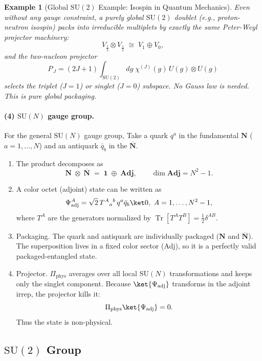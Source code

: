 \documentclass[12pt,a4paper]{article}
\newtheorem{example}{Example}
\begin{document}
\begin{example}[Global $\mathrm{SU}(2)$ Example: Isospin in Quantum Mechanics]
	Even without any gauge constraint, a purely global $\mathrm{SU}(2)$ doublet (e.g., proton-neutron isospin) packs into irreducible multiplets by exactly the same Peter-Weyl projector machinery:
	\[
	V_{\tfrac12}\otimes V_{\tfrac12}
	\;\cong\;
	V_1\oplus V_0,
	\]
	and the two-nucleon projector
	\[
	P_{\,J}
	= (2J+1)\int_{\mathrm{SU}(2)}dg\;\chi^{(J)}(g)\,U(g)\otimes U(g)
	\]
	selects the triplet ($J=1$) or singlet ($J=0$) subspace.
	No Gauss law is needed.
	This is pure global packaging.
\end{example}


\paragraph{(4) $\mathrm{SU}(N)$ gauge group.}
	
For the general $\mathrm{SU}(N)$ gauge group,	
Take a quark $q^{a}$ in the fundamental $\mathbf N$ ($a=1,\dots,N$) and an antiquark $\bar q_{b}$ in the $\overline{\mathbf N}$.

\begin{enumerate}
	\item The product decomposes as	
	$$
	\mathbf N\;\otimes\;\overline{\mathbf N}
	\;=\;
	\mathbf 1\;\oplus\;\mathbf{Adj},\qquad
	\dim\mathbf{Adj}=N^{2}-1.
	$$	

	\item A color octet (adjoint) state can be written as
	$$
	\Psi^A_{\rm adj} = \sqrt2\,T^A{}_{a}{}^{b}\,q^a\bar q_b\ket0, ~ A=1,\dots,N^2-1,
	$$
	where ${T^A}$ are the generators normalized by $\operatorname{Tr} [T^A T^B] = \tfrac12 \delta^{AB}$.
	
	\item Packaging.
	The quark and antiquark are individually packaged ($\mathbf N$ and $\overline{\mathbf N}$).
	The superposition lives in a fixed color sector (Adj), so it is a perfectly valid packaged-entangled state.
	
	\item Projector.
	$\Pi_{\text{phys}}$ averages over all local $\mathrm{SU}(N)$ transformations and keeps only the singlet component.
	Because $\ket{\Psi_{\text{adj}}}$ transforms in the adjoint irrep, the projector kills it:	
	$$
	\Pi_{\text{phys}}\ket{\Psi_{\text{adj}}}=0.
	$$	
	Thus the state is non-physical.
\end{enumerate}



\subsection{$\mathrm{SU}(2)$ Group}
\label{SEC:SU2Packaging}
\end{document}
